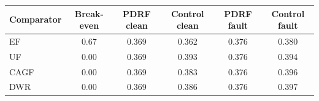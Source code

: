 \begin{tabular}{lccccc}
\toprule
Comparator & Break-even & PDRF clean & Control clean & PDRF fault & Control fault \\
\midrule
EF & 0.67 & 0.369 & 0.362 & 0.376 & 0.380 \\
UF & 0.00 & 0.369 & 0.393 & 0.376 & 0.394 \\
CAGF & 0.00 & 0.369 & 0.383 & 0.376 & 0.396 \\
DWR & 0.00 & 0.369 & 0.386 & 0.376 & 0.397 \\
\bottomrule
\end{tabular}
